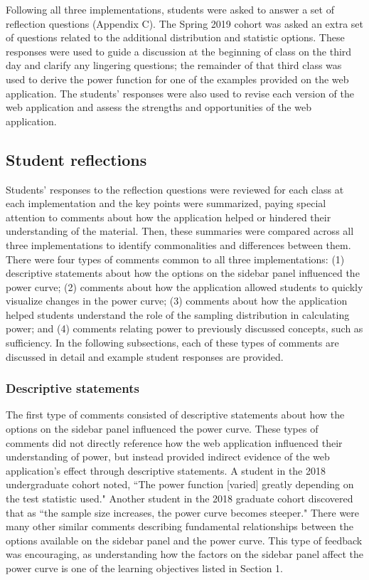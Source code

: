 \documentclass{TISE}
\begin{document}
Following all three implementations, students were asked to answer a set of reflection questions (Appendix C). The Spring 2019 cohort was asked an extra set of questions related to the additional distribution and statistic options. These responses were used to guide a discussion at the beginning of class on the third day and clarify any lingering questions; the remainder of that third class was used to derive the power function for one of the examples provided on the web application. The students' responses were also used to revise each version of the web application and assess the strengths and opportunities of the web application. 

\newpage

\subsection{Student reflections}

Students' responses to the reflection questions were reviewed for each class at each implementation and the key points were summarized, paying special attention to comments about how the application helped or hindered their understanding of the material. Then, these summaries were compared across all three implementations to identify commonalities and differences between them. There were four types of comments common to all three implementations: (1) descriptive statements about how the options on the sidebar panel influenced the power curve; (2) comments about how the application allowed students to quickly visualize changes in the power curve; (3) comments about how the application helped students understand the role of the sampling distribution in calculating power; and (4) comments relating power to previously discussed concepts, such as sufficiency. In the following subsections, each of these types of comments are discussed in detail and example student responses are provided. 

\subsubsection{Descriptive statements}

The first type of comments consisted of descriptive statements about how the options on the sidebar panel influenced the power curve. These types of comments did not directly reference how the web application influenced their understanding of power, but instead provided indirect evidence of the web application's effect through descriptive statements. A student in the 2018 undergraduate cohort noted, ``The power function [varied] greatly depending on the test statistic used." Another student in the 2018 graduate cohort discovered that as ``the sample size increases, the power curve becomes steeper." There were many other similar comments describing fundamental relationships between the options available on the sidebar panel and the power curve. This type of feedback was encouraging, as understanding how the factors on the sidebar panel affect the power curve is one of the learning objectives listed in Section 1. 
\end{document}
